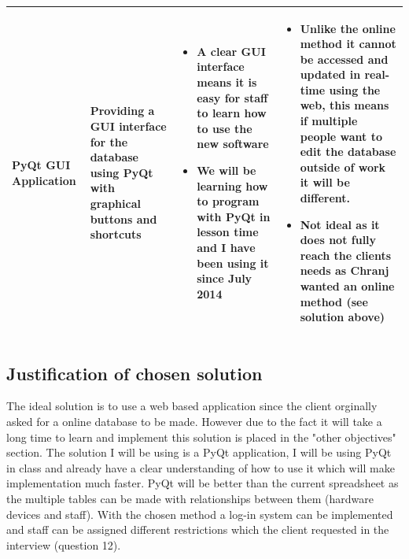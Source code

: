 \begin{center}
\begin{longtable}{|p{2.5cm}|p{3cm}|p{3.2cm}|p{3.2cm}|}
PyQt GUI Application &		 Providing a GUI interface for the database using PyQt with graphical buttons and shortcuts & 		\begin{itemize} \item A clear GUI interface means it is easy for staff to learn how to use the new software \item We will be learning how to program with PyQt in lesson time and I have been using it since July 2014   \end{itemize} & 		 \begin{itemize} \item Unlike the online method it cannot be accessed and updated in real-time using the web, this means if multiple people want to edit the database outside of work it will be different. \item Not ideal as it does not fully reach the clients needs as Chranj wanted an online method (see solution above) \end{itemize} \\
 \hline
\end{longtable}
\end{center}


\subsection{Justification of chosen solution}

The ideal solution is to use a web based application since the client orginally asked for a online database to be made. However due to the fact it will take a long time to learn and implement this solution is placed in the "other objectives" section. The solution I will be using is a PyQt application, I will be using PyQt in class and already have a clear understanding of how to use it which will make implementation much faster. PyQt will be better than the current spreadsheet as the multiple tables can be made with relationships between them (hardware devices and staff). With the chosen method a log-in system can be implemented and staff can be assigned different restrictions which the client requested in the interview (question 12).